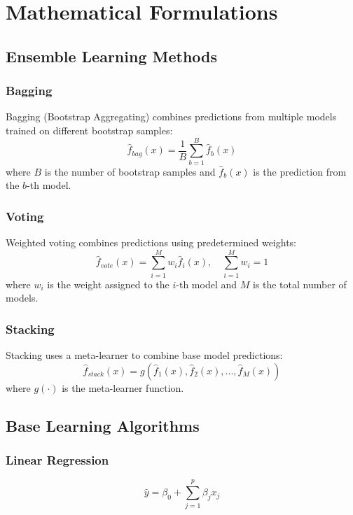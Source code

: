 
\section{Mathematical Formulations}

\subsection{Ensemble Learning Methods}

\subsubsection{Bagging}
Bagging (Bootstrap Aggregating) combines predictions from multiple models trained on different bootstrap samples:
\begin{equation}
\hat{f}_{bag}(x) = \frac{1}{B} \sum_{b=1}^{B} \hat{f}_b(x)
\end{equation}
where $B$ is the number of bootstrap samples and $\hat{f}_b(x)$ is the prediction from the $b$-th model.

\subsubsection{Voting}
Weighted voting combines predictions using predetermined weights:
\begin{equation}
\hat{f}_{vote}(x) = \sum_{i=1}^{M} w_i \hat{f}_i(x), \quad \sum_{i=1}^{M} w_i = 1
\end{equation}
where $w_i$ is the weight assigned to the $i$-th model and $M$ is the total number of models.

\subsubsection{Stacking}
Stacking uses a meta-learner to combine base model predictions:
\begin{equation}
\hat{f}_{stack}(x) = g(\hat{f}_1(x), \hat{f}_2(x), ..., \hat{f}_M(x))
\end{equation}
where $g(\cdot)$ is the meta-learner function.

\subsection{Base Learning Algorithms}

\subsubsection{Linear Regression}
\begin{equation}
\hat{y} = \beta_0 + \sum_{j=1}^{p} \beta_j x_j
\end{equation}

